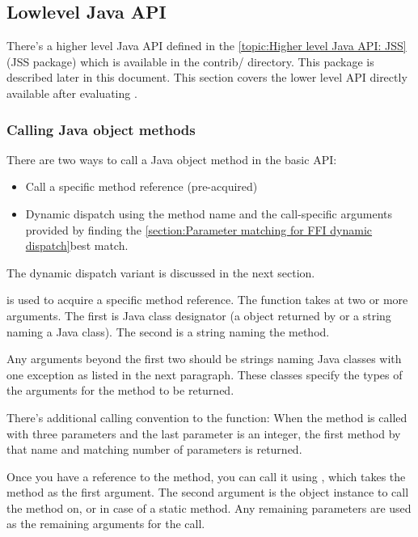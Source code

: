 \documentclass[10pt]{book}
\begin{document}
\subsection{Lowlevel Java API}

There's a higher level Java API defined in the
\ref{topic:Higher level Java API: JSS}(JSS package) which is available
in the contrib/ directory. This package is described later in this
document.  This section covers the lower level API directly available
after evaluating .

\subsubsection{Calling Java object methods}

There are two ways to call a Java object method in the basic API:

\begin{itemize}
\item Call a specific method reference (pre-acquired)
\item Dynamic dispatch using the method name and
  the call-specific arguments provided by finding the
  \ref{section:Parameter matching for FFI dynamic dispatch}{best match}.
\end{itemize}

The dynamic dispatch variant is discussed in the next section.

 is used to acquire a specific method reference.
The function takes at two or more arguments. The first is Java class designator
(a  object returned by  or a string naming
a Java class). The second is a string naming the method.

Any arguments beyond the first two should be strings naming Java classes with
one exception as listed in the next paragraph. These
classes specify the types of the arguments for the method to be returned.

There's additional calling convention to the  function:
When the method is called with three parameters and the last parameter is an
integer, the first method by that name and matching number of parameters is
returned.

Once you have a reference to the method, you can call it using ,
which takes the method as the first argument. The second argument is the
object instance to call the method on, or  in case of a static method.
Any remaining parameters are used as the remaining arguments for the call.
\end{document}
